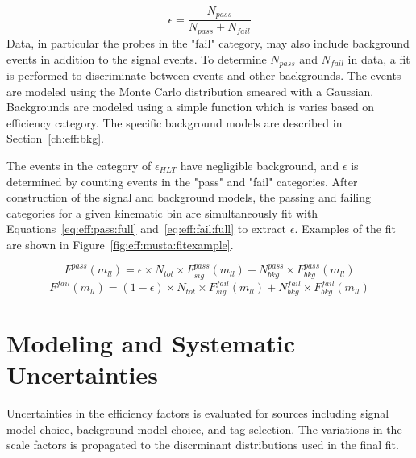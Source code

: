 \begin{equation}
\epsilon = \frac{N_{pass}}{N_{pass}+N_{fail}}
\label{eq:eff:eq}
\end{equation}
Data, in particular the probes in the "fail" category, may also include background events in addition to the \zll signal events. To determine $N_{pass}$ and $N_{fail}$ in data, a fit is performed to discriminate between \zll events and other backgrounds. The \zll events are modeled using the Monte Carlo distribution smeared with a Gaussian. Backgrounds are modeled using a simple function which is varies based on efficiency category. The specific background models are described in Section~\ref{ch:eff:bkg}.


The events in the category of $\epsilon_{HLT}$ have negligible background, and $\epsilon$ is determined by counting events in the "pass" and "fail" categories.
After construction of the signal and background models, the passing and failing categories for a given kinematic bin are simultaneously fit with Equations~\ref{eq:eff:pass:full} and~\ref{eq:eff:fail:full} to extract $\epsilon$. Examples of the fit are shown in Figure~\ref{fig:eff:musta:fitexample}.

\begin{equation}
F^{pass}\left(m_{ll}\right)=\epsilon \times N_{tot} \times F_{sig}^{pass}\left(m_{ll} \right) + N^{pass}_{bkg} \times F_{bkg}^{pass} \left(m_{ll} \right)
\label{eq:eff:pass:full}
\end{equation}
\begin{equation}
F^{fail}\left(m_{ll}\right)=\left(1-\epsilon\right) \times N_{tot} \times F_{sig}^{fail}\left(m_{ll} \right) + N^{fail}_{bkg} \times F_{bkg}^{fail} \left(m_{ll} \right)
\label{eq:eff:fail:full}
\end{equation}





\section{Modeling and Systematic Uncertainties}\label{ch:eff:systematics}
Uncertainties in the efficiency factors is evaluated for sources including signal model choice, background model choice, and tag selection. The variations in the scale factors is propagated to the discrminant distributions used in the final fit.
